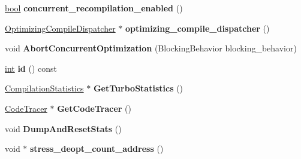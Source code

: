 \begin{DoxyCompactItemize}
\item 
\mbox{\label{classv8_1_1internal_1_1Isolate_ad2b367fff0549b42f75e6390d1729d68}} 
\mbox{\hyperlink{classbool}{bool}} {\bfseries concurrent\+\_\+recompilation\+\_\+enabled} ()
\item 
\mbox{\label{classv8_1_1internal_1_1Isolate_a6c0aa7adb516c0df9e03e9b7cee59729}} 
\mbox{\hyperlink{classv8_1_1internal_1_1OptimizingCompileDispatcher}{Optimizing\+Compile\+Dispatcher}} $\ast$ {\bfseries optimizing\+\_\+compile\+\_\+dispatcher} ()
\item 
\mbox{\label{classv8_1_1internal_1_1Isolate_a7b94e9195238afcee6a4c6d13df6e862}} 
void {\bfseries Abort\+Concurrent\+Optimization} (Blocking\+Behavior blocking\+\_\+behavior)
\item 
\mbox{\label{classv8_1_1internal_1_1Isolate_a2a1d34f6817206b28b0fa4a31f59ebbe}} 
\mbox{\hyperlink{classint}{int}} {\bfseries id} () const
\item 
\mbox{\label{classv8_1_1internal_1_1Isolate_a8c6187c968e42c0e5a475458511fa522}} 
\mbox{\hyperlink{classv8_1_1internal_1_1CompilationStatistics}{Compilation\+Statistics}} $\ast$ {\bfseries Get\+Turbo\+Statistics} ()
\item 
\mbox{\label{classv8_1_1internal_1_1Isolate_aae011e04ca5a2797e5ba70b298999c6c}} 
\mbox{\hyperlink{classv8_1_1internal_1_1CodeTracer}{Code\+Tracer}} $\ast$ {\bfseries Get\+Code\+Tracer} ()
\item 
\mbox{\label{classv8_1_1internal_1_1Isolate_a73b72026561ed02f5ffcd30b32a14dcd}} 
void {\bfseries Dump\+And\+Reset\+Stats} ()
\item 
\mbox{\label{classv8_1_1internal_1_1Isolate_a589c3f6e58352ba9ec247b59eafd27a8}} 
void $\ast$ {\bfseries stress\+\_\+deopt\+\_\+count\+\_\+address} ()
\item 
\mbox{\label{classv8_1_1internal_1_1Isolate_aa06184cdbfaad0485643b5b498a6ed18}} 

\end{DoxyCompactItemize}
